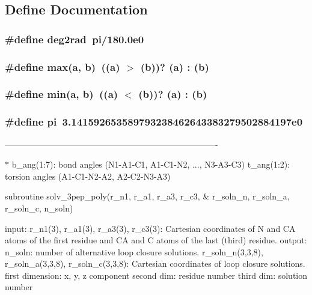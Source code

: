 \subsection{Define Documentation}
\subsubsection{\setlength{\rightskip}{0pt plus 5cm}\#define deg2rad~pi/180.0e0}\label{PTripepClosure_8h_0224561b0395b85ca3b1c11acb093ea4}


\subsubsection{\setlength{\rightskip}{0pt plus 5cm}\#define max(a, b)~((a) $>$ (b))? (a) : (b)}\label{PTripepClosure_8h_ba9726df73d617ec0e6116d8a1b81050}


\subsubsection{\setlength{\rightskip}{0pt plus 5cm}\#define min(a, b)~((a) $<$ (b))? (a) : (b)}\label{PTripepClosure_8h_9cc09fd5237e54feaa3e4cee4fedc869}


\subsubsection{\setlength{\rightskip}{0pt plus 5cm}\#define pi~3.141592653589793238462643383279502884197e0}\label{PTripepClosure_8h_c2b1cb8b3fb7713601463e82d1d2b627}


---------------------------------------------------------------------------- 

$\ast$ b\_\-ang(1:7): bond angles (N1-A1-C1, A1-C1-N2, ..., N3-A3-C3) t\_\-ang(1:2): torsion angles (A1-C1-N2-A2, A2-C2-N3-A3)

subroutine solv\_\-3pep\_\-poly(r\_\-n1, r\_\-a1, r\_\-a3, r\_\-c3, \& r\_\-soln\_\-n, r\_\-soln\_\-a, r\_\-soln\_\-c, n\_\-soln)

input: r\_\-n1(3), r\_\-a1(3), r\_\-a3(3), r\_\-c3(3): Cartesian coordinates of N and CA atoms of the first residue and CA and C atoms of the last (third) residue. output: n\_\-soln: number of alternative loop closure solutions. r\_\-soln\_\-n(3,3,8), r\_\-soln\_\-a(3,3,8), r\_\-soln\_\-c(3,3,8): Cartesian coordinates of loop closure solutions. first dimension: x, y, z component second dim: residue number third dim: solution number

